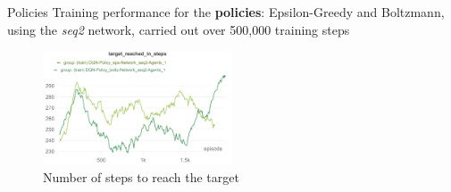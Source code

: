 \documentclass[10pt, xcolor={dvipsnames}]{beamer}
\begin{document}
{
\begin{frame}{Policies}
    Training performance for the \textbf{policies}: \alert{Epsilon-Greedy} and \alert{Boltzmann}, using the \textit{seq2} network, carried out over 500,000 training steps
    \begin{figure}
        \centering
        \includegraphics[width=0.5\textwidth, height=0.375\textwidth]{assets/results/policy/target_reached_in_steps.png}
        \caption*{Number of steps to reach the target}
    \end{figure}
\end{frame}
}
\end{document}
